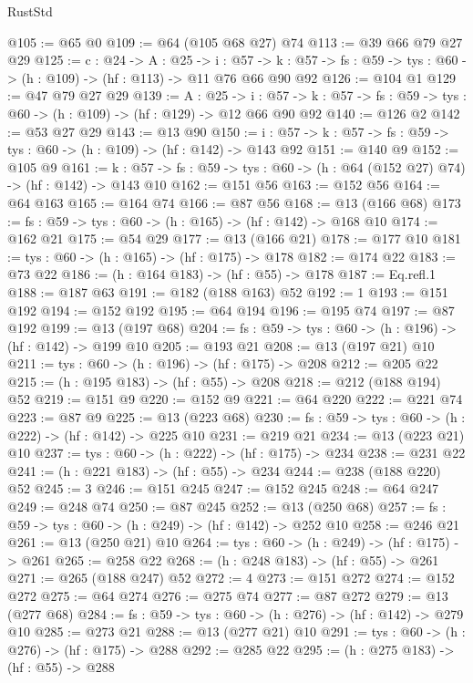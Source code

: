 \begin{lexlean}{RustStd}
\begin{coremodule}
@105 := @65 @0
@109 := @64 (@105 @68 @27) @74
@113 := @39 @66 @79 @27 @29
@125 := {c : @24} ->
  {A : @25} ->
  {i : @57} ->
  {k : @57} -> {fs : @59} -> {tys : @60} -> (h : @109) -> (hf : @113) -> @11 @76 @66 @90 @92
@126 := @104 @1
@129 := @47 @79 @27 @29
@139 := {A : @25} ->
  {i : @57} ->
  {k : @57} -> {fs : @59} -> {tys : @60} -> (h : @109) -> (hf : @129) -> @12 @66 @90 @92
@140 := @126 @2
@142 := @53 @27 @29
@143 := @13 @90
@150 := {i : @57} -> {k : @57} -> {fs : @59} -> {tys : @60} -> (h : @109) -> (hf : @142) -> @143 @92
@151 := @140 @9
@152 := @105 @9
@161 := {k : @57} ->
  {fs : @59} -> {tys : @60} -> (h : @64 (@152 @27) @74) -> (hf : @142) -> @143 @10
@162 := @151 @56
@163 := @152 @56
@164 := @64 @163
@165 := @164 @74
@166 := @87 @56
@168 := @13 (@166 @68)
@173 := {fs : @59} -> {tys : @60} -> (h : @165) -> (hf : @142) -> @168 @10
@174 := @162 @21
@175 := @54 @29
@177 := @13 (@166 @21)
@178 := @177 @10
@181 := {tys : @60} -> (h : @165) -> (hf : @175) -> @178
@182 := @174 @22
@183 := @73 @22
@186 := (h : @164 @183) -> (hf : @55) -> @178
@187 := Eq.refl.{1}
@188 := @187 @63
@191 := @182 (@188 @163) @52
@192 := 1
@193 := @151 @192
@194 := @152 @192
@195 := @64 @194
@196 := @195 @74
@197 := @87 @192
@199 := @13 (@197 @68)
@204 := {fs : @59} -> {tys : @60} -> (h : @196) -> (hf : @142) -> @199 @10
@205 := @193 @21
@208 := @13 (@197 @21) @10
@211 := {tys : @60} -> (h : @196) -> (hf : @175) -> @208
@212 := @205 @22
@215 := (h : @195 @183) -> (hf : @55) -> @208
@218 := @212 (@188 @194) @52
@219 := @151 @9
@220 := @152 @9
@221 := @64 @220
@222 := @221 @74
@223 := @87 @9
@225 := @13 (@223 @68)
@230 := {fs : @59} -> {tys : @60} -> (h : @222) -> (hf : @142) -> @225 @10
@231 := @219 @21
@234 := @13 (@223 @21) @10
@237 := {tys : @60} -> (h : @222) -> (hf : @175) -> @234
@238 := @231 @22
@241 := (h : @221 @183) -> (hf : @55) -> @234
@244 := @238 (@188 @220) @52
@245 := 3
@246 := @151 @245
@247 := @152 @245
@248 := @64 @247
@249 := @248 @74
@250 := @87 @245
@252 := @13 (@250 @68)
@257 := {fs : @59} -> {tys : @60} -> (h : @249) -> (hf : @142) -> @252 @10
@258 := @246 @21
@261 := @13 (@250 @21) @10
@264 := {tys : @60} -> (h : @249) -> (hf : @175) -> @261
@265 := @258 @22
@268 := (h : @248 @183) -> (hf : @55) -> @261
@271 := @265 (@188 @247) @52
@272 := 4
@273 := @151 @272
@274 := @152 @272
@275 := @64 @274
@276 := @275 @74
@277 := @87 @272
@279 := @13 (@277 @68)
@284 := {fs : @59} -> {tys : @60} -> (h : @276) -> (hf : @142) -> @279 @10
@285 := @273 @21
@288 := @13 (@277 @21) @10
@291 := {tys : @60} -> (h : @276) -> (hf : @175) -> @288
@292 := @285 @22
@295 := (h : @275 @183) -> (hf : @55) -> @288

\end{coremodule}
\end{lexlean}
